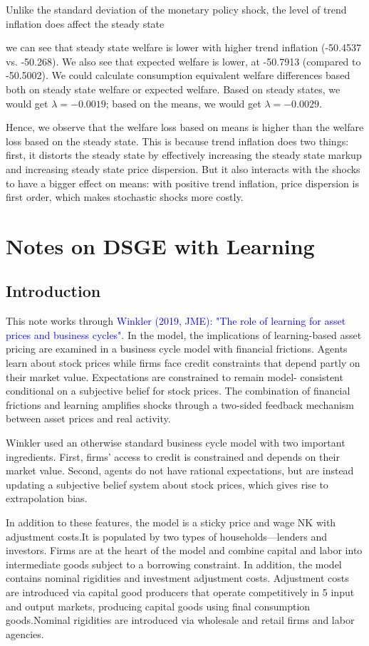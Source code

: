 \documentclass[cn,10pt,math=newtx,citestyle=gb7714-2015,bibstyle=gb7714-2015]{elegantbook}
\begin{document}
{		Unlike the standard deviation of the monetary policy shock, the level of trend inflation does affect the steady state { we can see that steady state welfare is lower with higher trend inflation (-50.4537 vs. -50.268). We also see that expected welfare is lower, at -50.7913 (compared to -50.5002). We could calculate consumption equivalent welfare differences based both on steady state welfare or expected welfare. Based on steady states, we would get $\lambda = -0.0019$; based on the means, we would get $\lambda = -0.0029$.
			
			Hence, we observe that the welfare loss based on means is higher than the welfare loss based on the steady state. This is because trend inflation does two things: first, it distorts the steady state by effectively increasing the steady state markup and increasing steady state price dispersion. But it also interacts with the shocks to have a bigger effect on means: with positive trend inflation, price dispersion is first order, which makes stochastic shocks more costly.
			
	\chapter{Notes on DSGE with Learning}
	\section{Introduction}
	
	This note works through \textcolor{blue}{Winkler (2019, JME): "The role of learning for asset prices and business cycles"}. In the model, the implications of learning-based asset pricing are examined in a business cycle model with financial frictions. Agents learn about stock prices while firms face credit constraints that depend partly on their market value. Expectations are constrained to remain model- consistent conditional on a subjective belief for stock prices. The combination of financial frictions and learning amplifies shocks through a two-sided feedback mechanism between asset prices and real activity.
	
	Winkler used an otherwise standard business cycle model with two important ingredients. First, firms’ access to credit is constrained and depends on their market value. Second, agents do not have rational expectations, but are instead updating a subjective belief system about stock prices, which gives rise to extrapolation bias.
	
	In addition to these features, the model is a sticky price and wage NK with adjustment costs.It is populated by two types of households---lenders and investors. Firms are at the heart of the model and combine capital and labor into intermediate goods subject to a borrowing constraint. In addition, the model contains nominal rigidities and investment adjustment costs. Adjustment costs are introduced via capital good producers that operate competitively in
	5 input and output markets, producing capital goods using final consumption goods.Nominal rigidities are introduced via wholesale and retail firms and labor agencies.
	
}}
\end{document}
